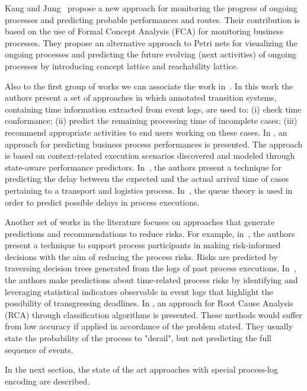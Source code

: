 Kang and Jung~\cite{doi:10.1108/02635571111137241} propose a new approach for monitoring the progress of ongoing processes and predicting probable performances and routes. Their contribution is based on the use of Formal Concept Analysis (FCA) for monitoring business processes. They propose an alternative approach to Petri nets for visualizing the ongoing processes and predicting the future evolving (next activities) of ongoing processes by introducing concept lattice and reachability lattice.   

Also to the first group of works we can associate the work in~\cite{DBLP:journals/is/AalstSS11}. In this work the authors present a set of approaches in which annotated transition systems, containing time information extracted from event logs, are used to: (i) check time conformance;
(ii) predict the remaining processing time of incomplete cases; (iii) recommend appropriate activities to end users working on these cases. In \cite{Folino}, an approach for predicting business process performances is presented. The approach is based on context-related execution scenarios discovered and modeled through state-aware performance predictors. In~\cite{Metzgeretal12}, the authors present a technique for predicting the delay between the expected and the actual arrival time of cases pertaining to a transport and logistics process. In~\cite{Senderovichetal15}, the queue theory is used in order to predict possible delays in process executions.

Another set of works in the literature focuses on approaches that generate predictions and recommendations to reduce risks. For example, in~\cite{DBLP:conf/caise/ConfortiLRA13}, the authors present a technique to support process participants in making risk-informed decisions with the aim of reducing the process risks. Risks are predicted by traversing decision trees generated from the logs of past process executions. In~\cite{Pika}, the authors make predictions about time-related process risks by identifying and leveraging statistical indicators observable in event logs that highlight the possibility of transgressing deadlines.
In \cite{suriadi}, an approach for Root Cause Analysis (RCA) through classification algorithms is presented. These methods would suffer from low accuracy if applied in accordance of the problem stated. They usually state the probability of the process to "derail", but not predicting the full sequence of events. 


In the next section, the state of the art approaches with special process-log encoding are described.




